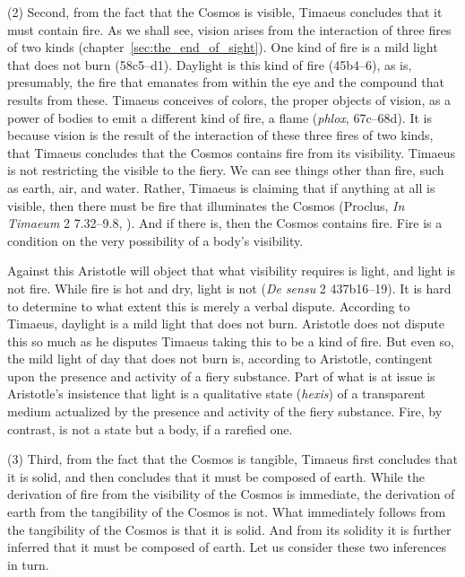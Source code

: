 (2) Second, from the fact that the Cosmos is visible, Timaeus concludes that it must contain fire. As we shall see, vision arises from the interaction of three fires of two kinds (chapter~\ref{sec:the_end_of_sight}). One kind of fire is a mild light that does not burn (58c5–d1). Daylight is this kind of fire (45b4–6), as is, presumably, the fire that emanates from within the eye and the compound that results from these. Timaeus conceives of colors, the proper objects of vision, as a power of bodies to emit a different kind of fire, a flame (\emph{phlox}, 67c–68d). It is because vision is the result of the interaction of these three fires of two kinds, that Timaeus concludes that the Cosmos contains fire from its visibility. Timaeus is not restricting the visible to the fiery. We can see things other than fire, such as earth, air, and water. Rather, Timaeus is claiming that if anything at all is visible, then there must be fire that illuminates the Cosmos (Proclus, \emph{In Timaeum} 2 7.32--9.8, \citealt{Diehl:1903re}). And if there is, then the Cosmos contains fire. Fire is a condition on the very possibility of a body's visibility.

Against this Aristotle will object that what visibility requires is light, and light is not fire. While fire is hot and dry, light is not (\emph{De sensu} 2 437b16--19). It is hard to determine to what extent this is merely a verbal dispute. According to Timaeus, daylight is a mild light that does not burn. Aristotle does not dispute this so much as he disputes Timaeus taking this to be a kind of fire. But even so, the mild light of day that does not burn is, according to Aristotle, contingent upon the presence and activity of a fiery substance. Part of what is at issue is Aristotle's insistence that light is a qualitative state (\emph{hexis}) of a transparent medium actualized by the presence and activity of the fiery substance. Fire, by contrast, is not a state but a body, if a rarefied one.

(3) Third, from the fact that the Cosmos is tangible, Timaeus first concludes that it is solid, and then concludes that it must be composed of earth. While the derivation of fire from the visibility of the Cosmos is immediate, the derivation of earth from the tangibility of the Cosmos is not. What immediately follows from the tangibility of the Cosmos is that it is solid. And from its solidity it is further inferred that it must be composed of earth. Let us consider these two inferences in turn. 

